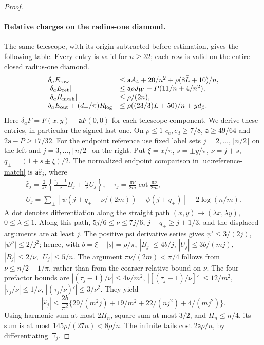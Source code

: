 \begin{proof}
\paragraph{Relative charges on the radius-one diamond.}
The same telescope, with its origin subtracted before estimation,
gives the following table. Every entry is valid for $n\geq32$;
each row is valid on the entire closed radius-one diamond.
\begin{equation}\label{uc:relative-components}
\begin{array}{ll}
\delta_aE_{\rm row}&\leq\mathsf a A_4+20/n^2+\rho(8\bar L+10)/n,\\
|\delta_aE_{\rm ret}|&\leq\mathsf a\rho J_W+P(11/n+4/n^2),\\
|\delta_aR_{\rm mesh}|&\leq\rho/(2n),\\
\delta_aE_{\rm out}+(d_+/\pi)R_{\log}
 &\leq\rho((23/3)L+50)/n+yd_\beta.
\end{array}
\end{equation}
Here $\delta_aF=F(x,y)-\mathsf aF(0,0)$ for each telescope component.
We derive these entries, in particular the signed last one.
On $\rho\leq1$ $c_e,c_d\geq7/8$, $\mathsf{a}\geq49/64$ and
$2\mathsf{a}-P\geq17/32$. For the endpoint reference use fixed label sets
$j=2,\ldots,\lfloor n/2\rfloor$ on the left and
$j=3,\ldots,\lfloor n/2\rfloor$ on the right. Put
$\xi=x/\pi$, $s=\pm y/\pi$, $\nu=j+s$, $q_\pm=(1+s\pm\xi)/2$.
The normalized endpoint comparison in \eqref{uc:reference-match} is
$\mathsf{a} \widehat\varepsilon_j$, where
\[
 \begin{gathered}
 \widehat\varepsilon_j=\frac2{\pi^2}\left\{\frac{\tau_j-1}{\nu}B_j
                              +\frac{\tau_j}{\nu}U_j\right\},
 \quad\tau_j=\frac{\pi\nu}{2m}\cot\frac{\pi\nu}{2m},\\
 U_j=\sum_\pm[\psi(j+q_\pm-\nu/(2m))-\psi(j+q_\pm)]
                                      -2\log(n/m).
 \end{gathered}
\]
A dot denotes differentiation along the straight path
$(x,y)\mapsto(\lambda x,\lambda y)$, $0\leq\lambda\leq1$. Along this path, $5j/6\leq\nu\leq7j/6$,
$j+q_\pm\geq j+1/3$, and the displaced arguments are at least $j$.
The positive psi derivative series gives
$\psi'\leq3/(2j)$, $|\psi''|\leq2/j^2$; hence, with
$b=\xi+|s|=\rho/\pi$, $|\dot B_j|\leq4b/j$, $|\dot U_j|\leq3b/(mj)$,
$|B_j|\leq2/\nu$, $|U_j|\leq5/n$.
The argument $\pi\nu/(2m)<\pi/4$ follows from
$\nu\leq n/2+1/\pi$, rather than from the coarser relative bound on $\nu$.
The four prefactor bounds are
$|({\tau_j-1})/\nu|\leq4\nu/m^2$,
$|[({\tau_j-1})/\nu]'|\leq12/m^2$,
$|\tau_j/\nu|\leq1/\nu$, $|(\tau_j/\nu)'|\leq3/\nu^2$.
They yield
\[
 |\dot{\widehat\varepsilon}_j|\leq\frac{2b}{\pi^2}
 \{29/(m^2j)+19/m^2+22/(nj^2)+4/(mj^2)\}.
\]
Using harmonic sum at most $2H_n$, square sum at most $3/2$, and
$H_n\leq n/4$, its sum is at most $145\rho/(27n)<8\rho/n$.
The infinite tails cost $2\mathsf{a}\rho/n$, by differentiating $\Xi_j$.


\end{proof}
